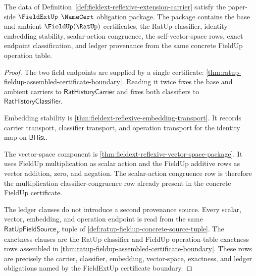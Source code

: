 \begin{theorem}
\label{thm:fieldext-reflexive-certificate-obligations}
The data of Definition~\ref{def:fieldext-reflexive-extension-carrier} satisfy
the paper-side $\FieldExtUp$ $\NameCert$ obligation package. The package
contains the base and ambient $\FieldUp(\RatUp)$ certificates, the RatUp
classifier, identity embedding stability, scalar-action congruence, the
self-vector-space rows, exact endpoint classification, and ledger provenance
from the same concrete FieldUp operation table.
\end{theorem}
\begin{proof}
The two field endpoints are supplied by a single certificate:
\autoref{thm:ratup-fieldup-assembled-certificate-boundary}. Reading it twice
fixes the base and ambient carriers to $\mathsf{RatHistoryCarrier}$ and fixes
both classifiers to $\mathsf{RatHistoryClassifier}$.

Embedding stability is
\autoref{thm:fieldext-reflexive-embedding-transport}. It records carrier
transport, classifier transport, and operation transport for the identity map
on $\mathsf{BHist}$.

The vector-space component is
\autoref{thm:fieldext-reflexive-vector-space-package}. It uses FieldUp
multiplication as scalar action and the FieldUp additive rows as vector
addition, zero, and negation. The scalar-action congruence row is therefore
the multiplication classifier-congruence row already present in the concrete
FieldUp certificate.

The ledger clauses do not introduce a second provenance source. Every scalar,
vector, embedding, and operation endpoint is read from the same
$\mathsf{RatUpFieldSource}_F$ tuple of
\autoref{def:ratup-fieldup-concrete-source-tuple}. The exactness clauses are
the RatUp classifier and FieldUp operation-table exactness rows assembled in
\autoref{thm:ratup-fieldup-assembled-certificate-boundary}. These rows are
precisely the carrier, classifier, embedding, vector-space, exactness, and
ledger obligations named by the FieldExtUp certificate boundary.
\end{proof}

